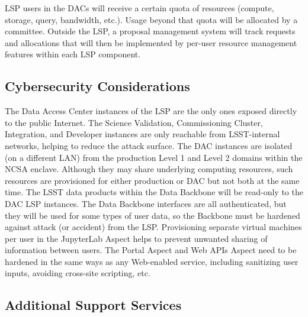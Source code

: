 LSP users in the DACs will receive a certain quota of resources (compute,
storage, query, bandwidth, etc.).  Usage beyond that quota will be allocated by
a committee.  Outside the LSP, a proposal management system will track requests
and allocations that will then be implemented by per-user resource management
features within each LSP component.

\subsection{Cybersecurity Considerations}\label{cybersecurity-considerations}

The Data Access Center instances of the LSP are the only ones exposed directly
to the public Internet.  The Science Validation, Commissioning Cluster,
Integration, and Developer instances are only reachable from LSST-internal
networks, helping to reduce the attack surface.  The DAC instances are isolated
(on a different LAN) from the production Level 1 and Level 2 domains within the
NCSA enclave.  Although they may share underlying computing resources, such
resources are provisioned for either production or DAC but not both at the
same time.  The LSST data products within the Data Backbone will be read-only
to the DAC LSP instances.  The Data Backbone interfaces are all authenticated,
but they will be used for some types of user data, so the Backbone must be
hardened against attack (or accident) from the LSP.  Provisioning separate
virtual machines per user in the JupyterLab Aspect helps to prevent unwanted
sharing of information between users.  The Portal Aspect and Web APIs Aspect
need to be hardened in the same ways as any Web-enabled service, including
sanitizing user inputs, avoiding cross-site scripting, etc.

\subsection{Additional Support Services}\label{additional-support-services}

